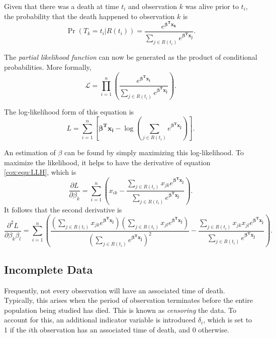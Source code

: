 Given that there was a death at time $t_i$ and observation $k$ was alive prior
to $t_i$, the probability that the death happened to observation $k$  is
\begin{equation}\label{cox:equ:death-prob}
\Pr(T_k = t_i | R(t_i)) =  \frac{e^{\mathbf{\beta^T x_k} }}{ \sum_{j \in R(t_i)} e^{\mathbf{\beta^T x_j}}}.
\end{equation}

The \textit{partial likelihood function} can now be generated as the product of conditional probabilities.
More formally,
\begin{equation}\label{cox:equ:likelihood}
\mathcal{L} = \prod_{i = 1}^n \left(  \frac{e^{\mathbf{\beta^T x_i} }}{ \sum_{j \in R(t_i)} e^{\mathbf{\beta^T x_j}}} \right).
\end{equation}

 The log-likelihood form of this equation is
\begin{equation}\label{cox:equ:LLH}
L = \sum_{i = 1}^n \left[  \mathbf{\beta^T x_i} - \log\left(\sum_{j \in R(t_i)} e^{\mathbf{\beta^T x_j} } \right) \right].
\end{equation}

An estimation of $\beta$ can be found by simply maximizing this log-likelihood.
To maximize the likelihood, it helps to have the derivative of equation
\ref{cox:equ:LLH}, which is
\begin{equation}\label{cox:equ:LLH derivative}
\frac{\partial L}{\partial \beta_k} = \sum_{i = 1}^n \left( x_{ik} - \frac{\sum_{j \in R(t_i)} x_{jk} e^{\mathbf{\beta^T x_j} } }{\sum_{j \in R(t_i)} e^{\mathbf{\beta^T x_j} } } \right).
\end{equation}
It follows that the second derivative is
\begin{equation}\label{cox:equ:LLH second derivative}
\frac{\partial^2 L}{\partial \beta_k \beta_l} = \sum_{i = 1}^n
            \left(
                \frac{\left(  \sum_{j \in R(t_i)} x_{jk} e^{\mathbf{\beta^T x_j} } \right)
                            \left(  \sum_{j \in R(t_i)} x_{jl} e^{\mathbf{\beta^T x_j} } \right)}
                     {\left( \sum_{j \in R(t_i)} e^{\mathbf{\beta^T x_j} } \right)^2 } -
                \frac{  \sum_{j \in R(t_i)} x_{jk}x_{jl} e^{\mathbf{\beta^T x_j} } }
                     {\sum_{j \in R(t_i)} e^{\mathbf{\beta^T x_j} } }
            \right).
\end{equation}

\subsection{Incomplete Data}
Frequently, not every observation will have an associated time of death.
Typically, this arises when the period of observation terminates before the
entire population being studied has died.  This is known as \textit{censoring}
the data.  To account for this, an additional indicator variable is introduced
$\delta_i$, which is set to 1 if the $i$th observation has an associated time of
death, and 0 otherwise.

